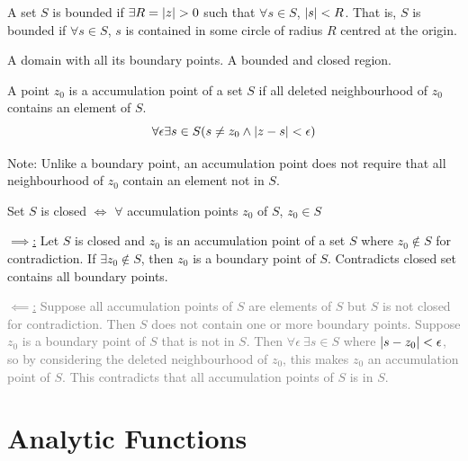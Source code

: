 \documentclass[12pt, english]{book}
\makeatletter
\renewenvironment{proof}[1][\proofname]{\par
	\pushQED{\qed}%
	\normalfont \topsep6\p@\@plus6\p@\relax
	\list{}{%
		\settowidth{\leftmargin}{\itshape\proofname:\hskip\labelsep}%
		\setlength{\labelwidth}{0pt}%
		\setlength{\itemindent}{-\leftmargin}%
		}%
	\item[\hskip\labelsep\itshape#1\@addpunct{:}]\ignorespaces
	}{\popQED\endlist\@endpefalse}
\makeatother
\begin{document}
	\begin{definition}
		\label{Bounded Set or Region Definition - Complex}
		A set $S$ is bounded if $\exists R = \abs{z} > 0$ such that $\forall s \in S$, $\abs{s} < R$. That is, $S$ is bounded if $\forall s \in S$, $s$ is contained in some circle of radius $R$ centred at the origin. 
	\end{definition}

	\begin{definition}
		\label{Closed Regoin Definition - Complex}
		A domain with all its boundary points. A bounded and closed region.
	\end{definition}

	\begin{definition}
		 
		\label{Accumulation/Limit Point Definition - Complex}
		A point $z_0$ is a accumulation point of a set $S$ if all deleted neighbourhood of $z_0$ contains an element of $S$. 
		$$\forall \epsilon \exists s \in S (s \neq z_0 \land \abs{z-s} < \epsilon)$$
	\end{definition}
	Note: Unlike a boundary point, an accumulation point does not require that all neighbourhood of $z_0$ contain an element not in $S$.
	
	\begin{theorem}
		Set $S$ is closed $\iff$ $\forall$ accumulation points $z_0$ of $S$, $z_0 \in S$
	\end{theorem}
	\begin{proof}
		\underline{$\implies$:}
		Let $S$ is closed and $z_0$ is an accumulation point of a set $S$ where $z_0 \notin S$ for contradiction. If $\exists z_0 \notin S$, then $z_0$ is a boundary point of $S$. Contradicts closed set contains all boundary points. 
		
		\textcolor{Grey}{
		\underline{$\impliedby$:}
		Suppose all accumulation points of $S$ are elements of $S$ but $S$ is not closed for contradiction. Then $S$ does not contain one or more boundary points. Suppose $z_0$ is a boundary point of $S$ that is not in $S$. Then $\forall \epsilon \ \exists s\in S$ where $\abs{s-z_0} < \epsilon$, so by considering the deleted neighbourhood of $z_0$, this makes $z_0$ an accumulation point of $S$. This contradicts that all accumulation points of $S$ is in $S$. 		
		}
	\end{proof}

	\chapter{Analytic Functions} \label{Analytic Functions Chapter - Complex}
\end{document}
